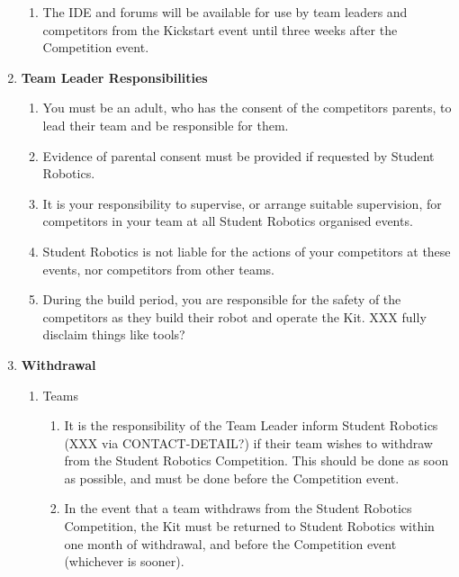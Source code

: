 \documentclass[a4paper, 11pt]{scrartcl}
\begin{document}
\begin{enumerate}
\begin{enumerate}
\item The IDE and forums will be available for use by team leaders and competitors
from the Kickstart event until three weeks after the Competition event.

\end{enumerate}

\item \textbf{Team Leader Responsibilities}
\begin{enumerate}

\item You must be an adult, who has the consent of the competitors parents, to
lead their team and be responsible for them.

\item Evidence of parental consent must be provided if requested by Student
Robotics.

\item It is your responsibility to supervise, or arrange suitable supervision,
for competitors in your team at all Student Robotics organised events.

\item Student Robotics is not liable for the actions of your competitors at
these events, nor competitors from other teams.

\item During the build period, you are responsible for the safety of the
competitors as they build their robot and operate the Kit. XXX fully disclaim
things like tools?

\end{enumerate}

\item \textbf{Withdrawal}
\begin{enumerate}

\item Teams
\begin{enumerate}
\item It is the responsibility of the Team Leader inform
Student Robotics (XXX via CONTACT-DETAIL?) if their team wishes to withdraw
from the Student Robotics Competition. This should be done as soon as possible,
and must be done before the Competition event.

\item In the event that a team withdraws from the Student Robotics Competition,
the Kit must be returned to Student Robotics within one month of withdrawal,
and before the Competition event (whichever is sooner).
\end{enumerate}


\end{enumerate}
\end{enumerate}
\end{document}
